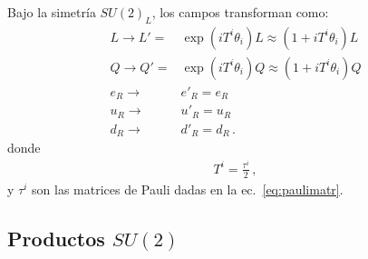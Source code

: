 \begin{frame}
Bajo la simetría $SU(2)_L$, los campos transforman como:
 \begin{align}
  L\to L'=&\exp(i T^i \theta_i)L\approx(1+i T^i\theta_i)L\nonumber\\
  Q\to Q'=&\exp(i T^i \theta_i)Q\approx(1+i T^i\theta_i)Q\nonumber\\
  e_R\to& e'_R=e_R\nonumber\\
  u_R\to& u'_R=u_R\nonumber\\
  d_R\to& d'_R=d_R\,.
\end{align}
donde
\begin{align}
  T^i=\frac{\tau^i}{2}\,,
\end{align}
y $\tau^i$ son las matrices de Pauli dadas en la ec.~\eqref{eq:paulimatr}.

\end{frame}
\subsection{Productos $SU(2)$}

